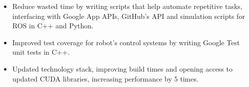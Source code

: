 \documentclass[10pt,a4paper,ragged2e]{resume-openfont}
\begin{document}





\begin{itemize}
  \item Reduce wasted time by writing scripts that help automate repetitive tasks, interfacing with Google App APIs, GitHub’s API and simulation scripts for ROS in C++ and Python.
  \item Improved test coverage for robot’s control systems by writing Google Test unit tests in C++.
  \item Updated technology stack, improving build times and opening access to updated CUDA libraries, increasing performance by 5 times.
\end{itemize}
\divider\small
\end{document}
